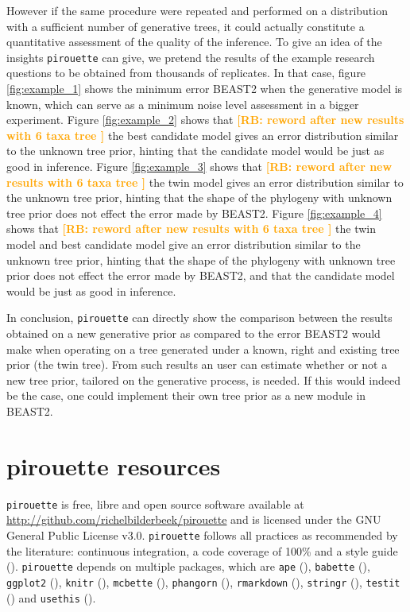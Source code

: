 \documentclass{article}
\newcommand{\richel}[1]{\textcolor{orange}{\textbf{[RB: #1]}}}
\begin{document}
However if the same procedure were repeated and performed on a distribution 
with a sufficient number of generative trees, 
it could actually constitute a quantitative assessment 
of the quality of the inference.
To give an idea of the insights \verb;pirouette; can give,
we pretend the results of the example research questions
to be obtained from thousands of replicates.
In that case, figure \ref{fig:example_1} shows 
the minimum error BEAST2 when the
generative model is known, which can serve as 
a minimum noise level assessment in a bigger experiment.  
Figure \ref{fig:example_2} shows that 
\richel{
  reword after new results with 6 taxa tree
} 
the best candidate model gives an error distribution similar to the unknown tree prior,
hinting that the candidate model would be just as good in inference.
Figure \ref{fig:example_3} shows that 
\richel{
  reword after new results with 6 taxa tree
} 
the twin model gives an error distribution similar to the unknown tree prior,
hinting that the shape of the phylogeny with unknown tree prior
does not effect the error made by BEAST2.
Figure \ref{fig:example_4} shows that 
\richel{
  reword after new results with 6 taxa tree
} 
the twin model and best candidate model give 
an error distribution similar to the unknown tree prior,
hinting that the shape of the phylogeny with unknown tree prior
does not effect the error made by BEAST2, 
and that the candidate model would be just as good in inference.

In conclusion, \verb;pirouette; can directly show 
the comparison between the results obtained 
on a new generative prior as compared to the error BEAST2 
would make when operating on a tree generated 
under a known, right and existing tree prior (the twin tree).
From such results an user can estimate whether or not a new tree prior, 
tailored on the generative process, is needed. 
If this would indeed be the case, 
one could implement their own tree prior as a new module in BEAST2.

\section{pirouette resources}

\verb;pirouette; is free, libre and open source software available at 
\url{http://github.com/richelbilderbeek/pirouette}
and is licensed under the GNU General Public License v3.0.
\verb;pirouette; follows all practices as recommended by the
literature: continuous integration, a code coverage of 100\%
and a style guide (\cite{style_guide}).
\verb;pirouette; depends on multiple packages, which are 
\verb;ape; (\cite{APE}), 
\verb;babette; (\cite{bilderbeek2018babette}),
\verb;ggplot2; (\cite{ggplot2}),
\verb;knitr; (\cite{knitr}),
\verb;mcbette; (\cite{mcbette}),
\verb;phangorn; (\cite{phangorn}),
\verb;rmarkdown; (\cite{rmarkdown}),
\verb;stringr; (\cite{stringr}),
\verb;testit; (\cite{testit}) and 
\verb;usethis; (\cite{usethis}).
\end{document}
